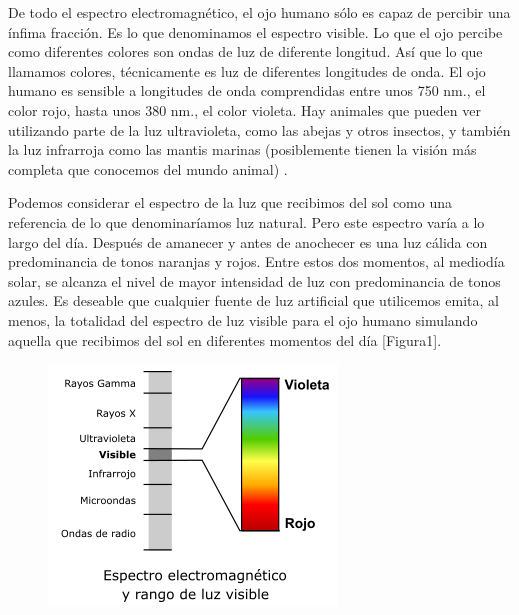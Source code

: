 \documentclass[10pt]{article}
\begin{document}
\setlength{\parskip}{2mm}

De todo el espectro electromagnético, el ojo humano sólo es capaz de percibir una ínfima fracción. Es lo que denominamos el espectro visible. Lo que el ojo percibe como diferentes colores son ondas de luz de diferente longitud. Así que lo que llamamos colores, técnicamente es luz de diferentes longitudes de onda. El ojo humano es sensible a longitudes de onda comprendidas entre unos 750 nm., el color rojo, hasta unos 380 nm., el color violeta. Hay animales que pueden ver utilizando parte de la luz ultravioleta, como las abejas y otros insectos, y también la luz infrarroja como las mantis marinas (posiblemente tienen la visión más completa que conocemos del mundo animal) \cite{IEEEreferencias:Ref13}.

\setlength{\parskip}{2mm}

Podemos considerar el espectro de la luz que recibimos del sol como una referencia de lo que denominaríamos luz natural. Pero este espectro varía a lo largo del día. Después de amanecer y antes de anochecer es una luz cálida con predominancia de tonos naranjas y rojos. Entre estos dos momentos, al mediodía solar, se alcanza el nivel de mayor intensidad de luz con predominancia de tonos azules. Es deseable que cualquier fuente de luz artificial que utilicemos emita, al menos, la totalidad del espectro de luz visible para el ojo humano simulando aquella que recibimos del sol en diferentes momentos del día \cite{IEEEreferencias:Ref13} [Figura1]. 

\begin{figure}[H]
	\begin{center}
\includegraphics[scale = 0.85]{Imagenes/espectro.png}
	\end{center} 
\end{figure}
\end{document}
